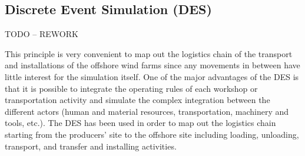 \subsection{Discrete Event Simulation (DES)}


TODO -- REWORK


This principle is very convenient to map out the logistics chain of the transport and installations of the offshore wind farms since any movements in between have little interest for the simulation itself. One of the major advantages of the DES is that it is possible to integrate the operating rules of each workshop or transportation activity and simulate the complex integration between the different actors (human and material resources, transportation, machinery and tools, etc.).  
The DES has been used in order to map out the logistics chain starting from the producers’ site to the offshore site including loading, unloading, transport, and transfer and installing activities.
